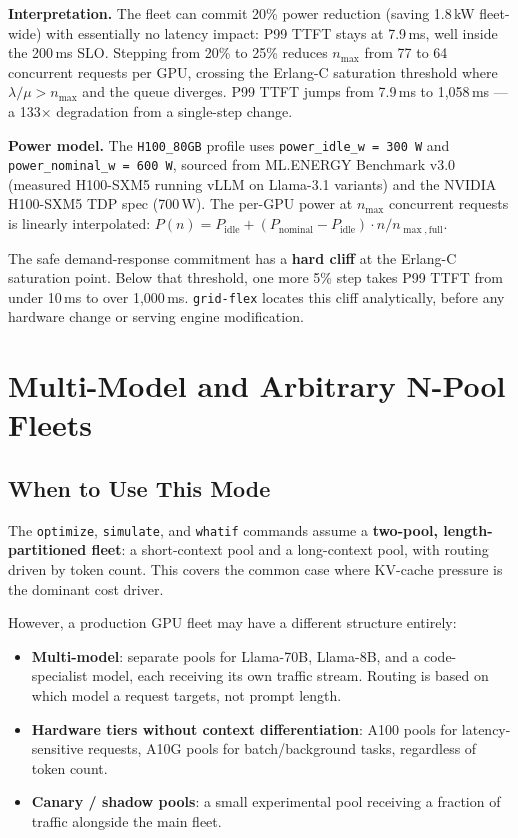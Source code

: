 \documentclass[11pt,a4paper]{article}
\begin{document}
\textbf{Interpretation.}
The fleet can commit 20\% power reduction (saving 1.8\,kW fleet-wide)
with essentially no latency impact: P99 TTFT stays at 7.9\,ms, well
inside the 200\,ms SLO.  Stepping from 20\% to 25\% reduces $n_{\max}$
from 77 to 64 concurrent requests per GPU, crossing the Erlang-C
saturation threshold where $\lambda / \mu > n_{\max}$ and the queue
diverges.  P99 TTFT jumps from 7.9\,ms to 1,058\,ms --- a 133$\times$
degradation from a single-step change.

\textbf{Power model.}
The \texttt{H100\_80GB} profile uses \texttt{power\_idle\_w~=~300\,W}
and \texttt{power\_nominal\_w~=~600\,W}, sourced from ML.ENERGY Benchmark
v3.0~\citep{chung2025mlenergy} (measured H100-SXM5 running vLLM on Llama-3.1
variants) and the NVIDIA H100-SXM5 TDP spec (700\,W).
The per-GPU power at $n_{\max}$ concurrent requests is linearly interpolated:
$P(n) = P_{\text{idle}} + (P_{\text{nominal}} - P_{\text{idle}}) \cdot n/n_{\max,\text{full}}$.

\begin{keyinsight}
  The safe demand-response commitment has a \textbf{hard cliff} at the
  Erlang-C saturation point.  Below that threshold, one more 5\% step
  takes P99 TTFT from under 10\,ms to over 1,000\,ms.  \texttt{grid-flex}
  locates this cliff analytically, before any hardware change or serving
  engine modification.
\end{keyinsight}

\section{Multi-Model and Arbitrary N-Pool Fleets}
\label{sec:multipool}

\subsection{When to Use This Mode}

The \texttt{optimize}, \texttt{simulate}, and \texttt{whatif} commands
assume a \textbf{two-pool, length-partitioned fleet}: a short-context pool
and a long-context pool, with routing driven by token count.  This covers
the common case where KV-cache pressure is the dominant cost driver.

However, a production GPU fleet may have a different structure entirely:

\begin{itemize}[nosep]
  \item \textbf{Multi-model}: separate pools for Llama-70B, Llama-8B, and
    a code-specialist model, each receiving its own traffic stream.
    Routing is based on which model a request targets, not prompt length.
  \item \textbf{Hardware tiers without context differentiation}: A100 pools
    for latency-sensitive requests, A10G pools for batch/background tasks,
    regardless of token count.
  \item \textbf{Canary / shadow pools}: a small experimental pool receiving
    a fraction of traffic alongside the main fleet.
\end{itemize}
\end{document}
